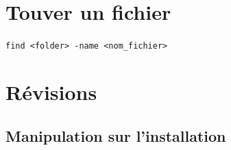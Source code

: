 \documentclass[a4paper]{article}
\begin{document}
\section{Touver un fichier}





\texttt{find <folder> -name <nom\_fichier>}




















\section{Révisions}










\subsection{Manipulation sur l'installation}
\end{document}
